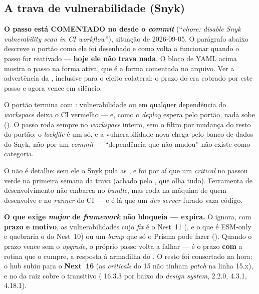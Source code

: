 \subsection{A trava de vulnerabilidade (Snyk)}

\begin{atencao}
\textbf{O passo está COMENTADO no  desde o \emph{commit}
} (\enquote{\emph{chore: disable Snyk vulnerability scan in CI
workflow}}), situação de 2026-09-05. O parágrafo abaixo descreve o portão como
ele foi desenhado e como volta a funcionar quando o passo for reativado ---
\textbf{hoje ele não trava nada}. O bloco de YAML acima mostra o passo na forma
ativa, que é a forma comentada no arquivo. Ver a advertência da ,
inclusive para o efeito colateral: o prazo do  era cobrado
por este passo e agora vence em silêncio.
\end{atencao}

O portão termina com
: vulnerabilidade
 ou  em qualquer dependência do \emph{workspace} deixa o
CI vermelho --- e, como o \emph{deploy} espera pelo portão, nada sobe
(). O passo roda sempre no \emph{workspace} inteiro, sem o filtro
por mudança do resto do portão: o \emph{lockfile} é um só, e a vulnerabilidade
nova chega pelo banco de dados do Snyk, não por um \emph{commit} ---
``dependência que não mudou'' não existe como categoria.

O  não é detalhe: sem ele o Snyk pula as , e foi
por aí que um \emph{critical} no  passou verde na primeira semana da
trava (achado pelo , que olha tudo). Ferramenta de
desenvolvimento não embarca no \emph{bundle}, mas roda na máquina de quem
desenvolve e no \emph{runner} do CI --- e é lá que um \emph{dev server} furado
vaza código.

\begin{nota}
\textbf{O que exige \emph{major} de \emph{framework} não bloqueia --- expira.}
O  ignora, com \textbf{prazo e motivo}, as vulnerabilidades
cujo \emph{fix} é o Nest~11 (, e o  que é ESM-only
e quebraria o  do Nest~10) ou um \emph{bump} que só o Prisma pode
fazer (). Quando o prazo vence sem o \emph{upgrade}, o próprio
passo volta a falhar --- é o prazo \textbf{com} a rotina que o cumpre, a
resposta à armadilha do . O resto foi consertado na hora: o hub
subiu para o \textbf{Next~16} (as \emph{criticals} do 15 não tinham \emph{patch}
na linha 15.x), e  no  da raiz cobre o
transitivo ( 16.3.3 por baixo do \emph{design system}, 
2.2.0,  4.3.1,  4.18.1).
\end{nota}

